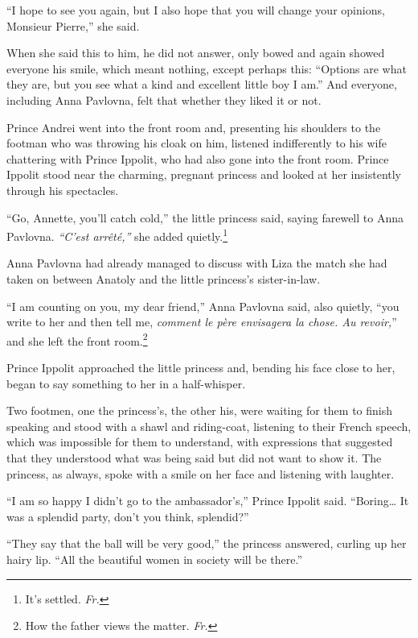 ``I hope to see you again, but I also hope that you will change your opinions, Monsieur Pierre,'' she said. %

When she said this to him, he did not answer, only bowed and again showed everyone his smile, which meant nothing, except perhaps this: ``Options are what they are, but you see what a kind and excellent little boy I am.'' And everyone, including Anna Pavlovna, felt that whether they liked it or not.

Prince Andrei went into the front room and, presenting his shoulders to the footman who was throwing his cloak on him, listened indifferently to his wife chattering with Prince Ippolit, who had also gone into the front room. Prince Ippolit stood near the charming, pregnant princess and looked at her insistently through his spectacles.

``Go, Annette, you'll catch cold,'' the little princess said, saying farewell to Anna Pavlovna. \textit{``C'est arr\^et\'e,''} she added quietly.\footnote{It's settled. \textit{Fr.}} %

Anna Pavlovna had already managed to discuss with Liza the match she had taken on between Anatoly and the little princess's sister-in-law.

``I am counting on you, my dear friend,'' Anna Pavlovna said, also quietly, ``you write to her and then tell me, \textit{comment le p\`ere envisagera la chose. Au revoir,}'' and she left the front room.\footnote{How the father views the matter. \textit{Fr.}} %

Prince Ippolit approached the little princess and, bending his face close to her, began to say something to her in a half-whisper.

Two footmen, one the princess's, the other his, were waiting for them to finish speaking and stood with a shawl and riding-coat, listening to their French speech, which was impossible for them to understand, with expressions that suggested that they understood what was being said but did not want to show it. The princess, as always, spoke with a smile on her face and listening with laughter.

``I am so happy I didn't go to the ambassador's,'' Prince Ippolit said. ``Boring\ldots{} It was a splendid party, don't you think, splendid?'' %

``They say that the ball will be very good,'' the princess answered, curling up her hairy lip. ``All the beautiful women in society will be there.'' %

